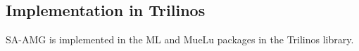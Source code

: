 \subsection{Implementation in Trilinos}
SA-AMG is implemented in the ML and MueLu packages in the Trilinos library.

